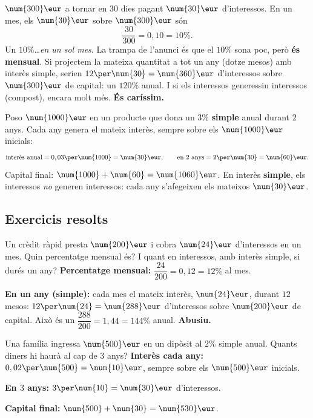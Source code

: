 \begin{exemple}
$\num{300}\eur$ a tornar en $30$ dies pagant $\num{30}\eur$ d'interessos. En un mes,
els $\num{30}\eur$ sobre $\num{300}\eur$ són
\[
\frac{\num{30}}{\num{300}}=0,10=10\%.
\]
Un $10\%$\dots \emph{en un sol mes}. La trampa de l'anunci és que el $10\%$ sona poc,
però \textbf{és mensual}. Si projectem la mateixa quantitat a tot un any (dotze mesos)
amb interès simple, serien $12\per\num{30}=\num{360}\eur$ d'interessos sobre
$\num{300}\eur$ de capital: un $120\%$ anual. I si els interessos generessin
interessos (compost), encara molt més. \textbf{És caríssim.}
\end{exemple}

\begin{exemple}
Poso $\num{1000}\eur$ en un producte que dona un $3\%$ \textbf{simple} anual durant
$2$ anys. Cada any genera el mateix interès, sempre sobre els $\num{1000}\eur$
inicials:
\[
\text{interès anual}=0,03\per\num{1000}=\num{30}\eur,\qquad
\text{en $2$ anys}=2\per\num{30}=\num{60}\eur.
\]
Capital final: $\num{1000}+\num{60}=\num{1060}\eur$. En interès \textbf{simple}, els
interessos \emph{no} generen interessos: cada any s'afegeixen els mateixos
$\num{30}\eur$.
\end{exemple}

\subsection{Exercicis resolts}

\begin{exresolt}
Un crèdit ràpid presta $\num{200}\eur$ i cobra $\num{24}\eur$ d'interessos en un mes.
Quin percentatge mensual és? I quant en interessos, amb interès simple, si durés un
any?
\solucio
\textbf{Percentatge mensual:} $\dfrac{\num{24}}{\num{200}}=0,12=12\%$ al mes.

\textbf{En un any (simple):} cada mes el mateix interès, $\num{24}\eur$, durant $12$
mesos: $12\per\num{24}=\num{288}\eur$ d'interessos sobre $\num{200}\eur$ de capital.
Això és un $\dfrac{\num{288}}{\num{200}}=1,44=144\%$ anual. \textbf{Abusiu.}
\end{exresolt}

\begin{exresolt}
Una família ingressa $\num{500}\eur$ en un dipòsit al $2\%$ simple anual. Quants
diners hi haurà al cap de $3$ anys?
\solucio
\textbf{Interès cada any:} $0,02\per\num{500}=\num{10}\eur$, sempre sobre els
$\num{500}\eur$ inicials.

\textbf{En $3$ anys:} $3\per\num{10}=\num{30}\eur$ d'interessos.

\textbf{Capital final:} $\num{500}+\num{30}=\num{530}\eur$.
\end{exresolt}

